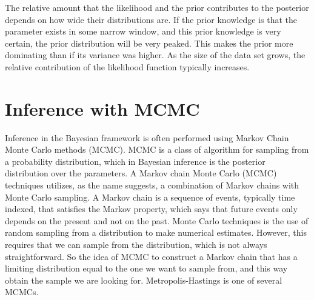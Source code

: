 The relative amount that the likelihood and the prior contributes to the posterior depends on how wide their distributions are. If the prior knowledge is that the parameter exists in some narrow window, and this prior knowledge is very certain, the prior distribution will be very peaked. This makes the prior more dominating than if its variance was higher. As the size of the data set grows, the relative contribution of the likelihood function typically  increases. 










\section{Inference with MCMC}
\label{Metropolis}

Inference in the Bayesian framework is often performed using Markov Chain Monte Carlo methods (MCMC). MCMC is a class of algorithm for sampling from a probability distribution, which in Bayesian inference is the posterior distribution over the parameters. A Markov chain Monte Carlo (MCMC) techniques utilizes, as the name suggests, a combination of Markov chains with Monte Carlo sampling. A Markov chain is a sequence of events, typically time indexed, that satisfies the Markov property, which says that future events only depends on the present and not on the past. Monte Carlo techniques is the use of random sampling from a distribution to make numerical estimates. However, this requires that we can sample from the distribution, which is not always straightforward. So the idea of MCMC to construct a Markov chain that has a limiting distribution equal to the one we want to sample from, and this way obtain the sample we are looking for. Metropolis-Hastings is one of several MCMCs.


